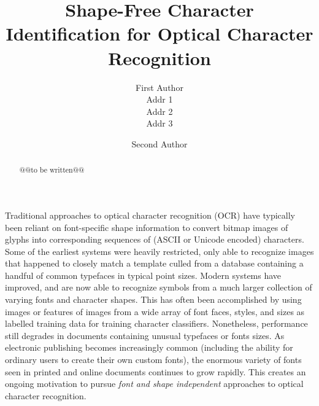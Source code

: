 \documentclass[times, 10pt,twocolumn]{article}
\begin{document}
\title{Shape-Free Character Identification for Optical Character Recognition}

\author{First Author\\
Addr 1\\
Addr 2\\
Addr 3\\
\and
Second Author\\
}


\maketitle
\thispagestyle{empty}


\begin{abstract}
@@to be written@@
\end{abstract}



Traditional approaches to optical character recognition (OCR) have typically
been reliant on font-specific shape information to convert bitmap
images of glyphs into corresponding sequences of (ASCII or Unicode encoded)
characters.  Some of the earliest systems were heavily restricted, only
able to recognize images that happened to closely match a template culled from
a database containing a handful of common typefaces in typical point
sizes.  Modern systems have improved, and are now able to recognize
symbols from a much larger collection of varying fonts and character shapes.  
This has often been accomplished by using images or features of images from a 
wide array of font faces, styles, and sizes as labelled training data for 
training character classifiers.  Nonetheless, performance still degrades
in documents containing unusual typefaces or fonts sizes.  
As electronic publishing becomes increasingly common (including the
ability for ordinary users to create their own custom fonts), the enormous
variety of fonts seen in printed and online documents continues to grow rapidly.
This creates an ongoing motivation to pursue {\em font and shape
independent} approaches to  optical character recognition.
\end{document}

